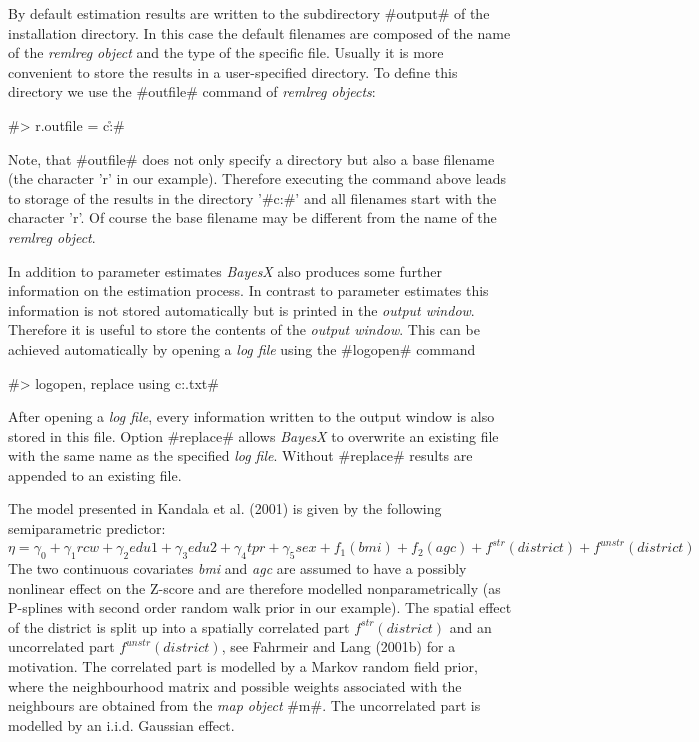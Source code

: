\documentclass{article}
\begin{document}
By default estimation results are written to the subdirectory
#output# of the installation directory. In this case the default
filenames are composed of the name of the {\it remlreg object} and
the type of the specific file. Usually it is more convenient to
store the results in a user-specified directory. To define this
directory we use the #outfile# command of {\it remlreg objects}:

#> r.outfile = c:\data\r#

Note, that #outfile# does not only specify a directory but also a
base filename (the character 'r' in our example). Therefore
executing the command above leads to storage of the results in the
directory '#c:\data#' and all filenames start with the character
'r'. Of course the base filename may be different from the name of
the {\it remlreg object}.

In addition to parameter estimates {\it BayesX} also produces some
further information on the estimation process. In contrast to
parameter estimates this information is not stored automatically
but is printed in the {\it output window}. Therefore it is useful
to store the contents of the {\it output window}. This can be
achieved automatically by opening a {\it log file} using the
#logopen# command

#> logopen, replace using c:\data\logreml.txt#

After opening a {\it log file}, every information written to the
output window is also stored in this file. Option #replace# allows
{\it BayesX} to overwrite an existing file with the same name as the
specified {\it log file}. Without #replace# results are appended to
an existing file.

The model presented in Kandala et al. (2001) is given by the
following semiparametric predictor:
\[\eta=\gamma_0+\gamma_1rcw+\gamma_2edu1+\gamma_3edu2+\gamma_4tpr+\gamma_5sex+f_1(bmi)+f_2(agc)+f^{str}(district)+f^{unstr}(district)\]
The two continuous covariates {\em bmi} and {\em agc} are assumed to
have a possibly nonlinear effect on the Z-score and are therefore
modelled nonparametrically (as P-splines with second order random
walk prior in our example). The spatial effect of the district is
split up into a spatially correlated part $ f^{str}(district)$ and
an uncorrelated part $f^{unstr}(district)$, see Fahrmeir and Lang
(2001b) \nocite{fahlan01b} for a motivation. The correlated part is
modelled by a Markov random field prior, where the neighbourhood
matrix and possible weights associated with the neighbours are
obtained from the {\it map object} #m#. The uncorrelated part is
modelled by an  i.i.d. Gaussian effect.
\end{document}
